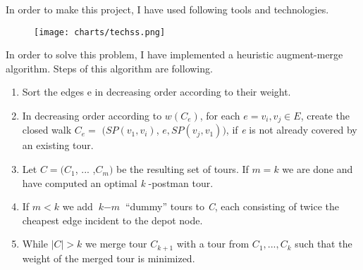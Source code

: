 \documentclass{beamer}
\begin{document}
\begin{projectrequirements}
In order to make this project, I have used following tools and technologies.
\vspace{0.02\textheight}
	\begin{figure}
		    \centering
		    \texttt{[image: charts/techss.png]}
		    \label{fig:widerface5}
	\end{figure}

\end{projectrequirements}

\begin{projectdesign}
	In order to solve this problem, I have implemented a heuristic augment-merge algorithm.\cite{book7} Steps of this algorithm are following.
    \vspace{0.02\textheight}
	\begin{enumerate}
	 \item Sort the edges e in decreasing order according to their weight.
        \vspace{0.02\textheight}
		\item In decreasing order according to $ w(C_{e}) $, for each $e = {v_{i}, v_{j}} \in E $, create the closed walk $C_{e} =$ $(SP(v_{1}, v_{i})$, $e, SP(v_{j}, v_{1}))$, if \textit{e} is not already covered by an existing tour.
		\vspace{0.02\textheight}
		\item  Let $C = (C_{1}$, ... ,$C_{m})$ be the resulting set of tours. If $m = k$ we are done and have computed an optimal \textit{k }-postman tour. 
		\vspace{0.02\textheight}
		\item If $m < k$ we add $\textit{k} - \textit{m}$ “dummy” tours to \textit{C}, each consisting of twice the cheapest edge incident to the depot node.
\vspace{0.02\textheight}
		\item While $|C| > k$ we merge tour $ C_{k+1} $ with a tour from $C_{1}, ... ,C_{k}$ such that the weight of the merged tour is minimized.
	\end{enumerate} 
	 

	
  
		
\end{projectdesign}
\end{document}
